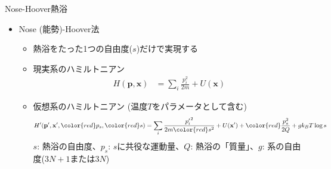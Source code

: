 
\begin{frame}[t,fragile]{Nose-Hoover熱浴}
  \begin{itemize}
  \item Nose (能勢)-Hoover法
    \begin{itemize}
    \item 熱浴をたった1つの自由度($s$)だけで実現する
    \item 現実系のハミルトニアン
      \begin{align*}
        H(\mathbf{p},\mathbf{x}) &= \sum_i \frac{p_i^2}{2m} + U(\mathbf{x})
      \end{align*}
    \item 仮想系のハミルトニアン (温度$T$をパラメータとして含む)
      \begin{align*}
        H'(\mathbf{p}',\mathbf{x}',{\color{red}p_s},{\color{red}s}) &= \sum_i \frac{{p'_i}^2}{2m{\color{red}s^2}} + U(\mathbf{x}') + {\color{red}\frac{p_s^2}{2Q} + g k_B T\log s}
      \end{align*}
      $s$: 熱浴の自由度、$p_s$: $s$に共役な運動量、$Q$: 熱浴の「質量」、$g$: 系の自由度($3N+1$または$3N$)
    \end{itemize}
  \end{itemize}
\end{frame}

